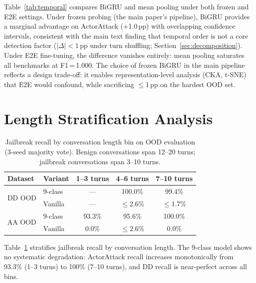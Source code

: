 Table~\ref{tab:temporal} compares BiGRU and mean pooling under both frozen and E2E settings. Under frozen probing (the main paper's pipeline), BiGRU provides a marginal advantage on ActorAttack (+1.0\,pp) with overlapping confidence intervals, consistent with the main text finding that temporal order is not a core detection factor ($|\Delta| < 1$\,pp under turn shuffling; Section~\ref{sec:decomposition}). Under E2E fine-tuning, the difference vanishes entirely: mean pooling saturates all benchmarks at F1\,=\,1.000. The choice of frozen BiGRU in the main pipeline reflects a design trade-off: it enables representation-level analysis (CKA, t-SNE) that E2E would confound, while sacrificing $\leq$1\,pp on the hardest OOD set.

\section{Length Stratification Analysis}
\label{app:length}

\begin{table}[ht]
\centering
\footnotesize
\caption{Jailbreak recall by conversation length bin on OOD evaluation (3-seed majority vote). Benign conversations span 12--20 turns; jailbreak conversations span 3--10 turns.}
\label{tab:length}
\begin{tabular}{@{}llccc@{}}
\toprule
\textbf{Dataset} & \textbf{Variant} & 1--3 turns & 4--6 turns & 7--10 turns \\
\midrule
\multirow{2}{*}{DD OOD} & 9-class & --- & 100.0\% & 99.4\% \\
& Vanilla & --- & $\leq$2.6\% & $\leq$1.7\% \\
\midrule
\multirow{2}{*}{AA OOD} & 9-class & 93.3\% & 95.6\% & 100.0\% \\
& Vanilla & 0.0\% & $\leq$2.6\% & 0.0\% \\
\bottomrule
\end{tabular}
\end{table}

Table~\ref{tab:length} stratifies jailbreak recall by conversation length. The 9-class model shows no systematic degradation: ActorAttack recall increases monotonically from 93.3\% (1--3 turns) to 100\% (7--10 turns), and DD recall is near-perfect across all bins.

